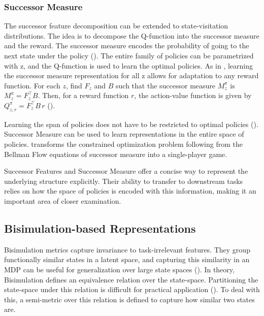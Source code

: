 \documentclass{article}
\begin{document}
\subsubsection{Successor Measure}
The successor feature decomposition can be extended to state-visitation distributions. The idea is to decompose the Q-function into the successor measure and the reward. The successor measure encodes the probability of going to the next state under the policy (\cite{touati2021learning}). The entire family of policies can be parametrized with z, and the Q-function is used to learn the optimal policies. As in \cite{touati2021learning}, learning the successor measure representation for all z allows for adaptation to any reward function. For each $z$, find $F_z$ and $B$ such that the successor measure $M^{\pi}_z$ is $M^{\pi}_z = F_z^{\top} B$. Then, for a reward function $r$, the action-value function is given by $Q^{\pi}_{z,r} = F_z^{\top} B\,r$ (\cite{touati2021learning}).

Learning the span of policies does not have to be restricted to optimal policies (\cite{agarwal2024proto}). Successor Measure can be used to learn representations in the entire space of policies. \cite{agarwal2024proto} transforms the constrained optimization problem following from the Bellman Flow equations of successor measure into a single-player game.

Successor Features and Successor Measure offer a concise way to represent the underlying structure explicitly. Their ability to transfer to downstream tasks relies on how the space of policies is encoded with this information, making it an important area of closer examination. 


\subsection{Bisimulation-based Representations}
Bisimulation metrics capture invariance to task-irrelevant features. They group functionally similar states in a latent space, and capturing this similarity in an MDP can be useful for generalization over large state spaces (\cite{ferns2004metrics}). In theory, Bisimulation defines an equivalence relation over the state-space. Partitioning the state-space under this relation is difficult for practical application (\cite{ferns2004metrics}). To deal with this, a semi-metric over this relation is defined to capture how similar two states are.
\end{document}
